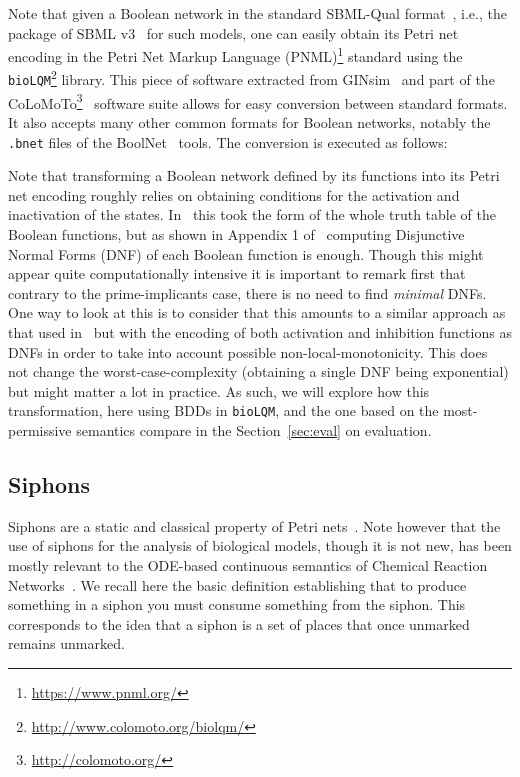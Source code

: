 \documentclass[preprint,12pt]{elsarticle}
\begin{document}
Note that given a Boolean network in the standard SBML-Qual format~\cite{chaouiya2013sbml}, i.e., the package of SBML v3~\cite{keating2020sbml} for such models, one can easily obtain its Petri net encoding in the Petri Net Markup Language  (PNML)\footnote{\url{https://www.pnml.org/}} standard using the \texttt{bioLQM}\footnote{\url{http://www.colomoto.org/biolqm/}} library.
This piece of software extracted from GINsim~\cite{chaouiya2012logical} and part of the CoLoMoTo\footnote{\url{http://colomoto.org/}}~\cite{naldi2015cooperative} software suite allows for easy conversion between standard formats.
It also accepts many other common formats for Boolean networks, notably the \verb|.bnet| files of the  BoolNet~\cite{mussel2010boolnet,klarner2017pyboolnet} tools.
The conversion is executed as follows:


Note that transforming a Boolean network defined by its functions into its Petri net encoding roughly relies on obtaining conditions for the activation and inactivation of the states. In~\cite{chaouiya2004qualitative} this took the form of the whole truth table of the Boolean functions, but as shown in Appendix 1 of~\cite{chatain2014characterization} computing Disjunctive Normal Forms (DNF) of each Boolean function is enough.
Though this might appear quite computationally intensive it is important to remark first that contrary to the prime-implicants case, there is no need to find \emph{minimal} DNFs.
One way to look at this is to consider that this amounts to a similar approach as that used in~\cite{DBLP:conf/ictai/ChevalierFPZ19} but with the encoding of both activation and inhibition functions as DNFs in order to take into account possible non-local-monotonicity.
This does not change the worst-case-complexity (obtaining a single DNF being exponential) but might matter a lot in practice.
As such, we will explore how this transformation, here using BDDs in \texttt{bioLQM}, and the one based on the most-permissive semantics compare in the Section~\ref{sec:eval} on evaluation.

\subsection{Siphons}

Siphons are a static and classical property of Petri nets~\cite{peterson1981petri}.
Note however that the use of siphons for the analysis of biological models, though it is not new, has been mostly relevant to the ODE-based continuous semantics of Chemical Reaction Networks~\cite{angeli2007petri,angeli2011persistence,degrand2020graphical}.
We recall here the basic definition establishing that to produce something in a siphon you must consume something from the siphon.
This corresponds to the idea that a siphon is a set of places that once unmarked remains unmarked.
\end{document}
